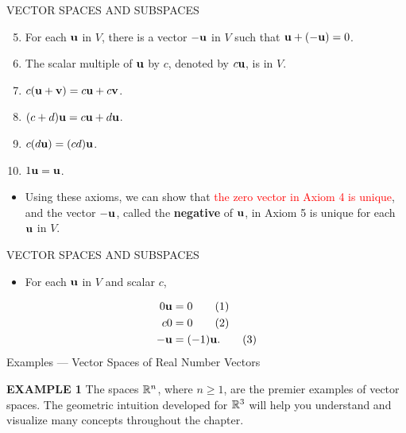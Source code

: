 \begin{frame}[shrink=9]{VECTOR SPACES AND SUBSPACES}
\begin{enumerate}
\setcounter{enumi}{4}
\item For each $\mathbf{u}$ in $V$, there is a vector $-\mathbf{u}$ in $V$ such that $\mathbf{u}+(-\mathbf{u})=0$.
\item The scalar multiple of $\mathbf{u}$ by $c$, denoted by $c\mathbf{u}$, is in $V$.
\item $c(\mathbf{u}+\mathbf{v})=c\mathbf{u}+c\mathbf{v}$.
\item $(c+d)\mathbf{u}=c\mathbf{u}+d\mathbf{u}$.
\item $c(d\mathbf{u})=(cd)\mathbf{u}$.
\item $1\mathbf{u}=\mathbf{u}$.
\end{enumerate}
\begin{itemize}
\item Using these axioms, we can show that \textcolor{red}{the zero vector in Axiom 4 is unique}, and the vector $-\mathbf{u}$, called the \textbf{negative} of $\mathbf{u}$, in Axiom 5 is unique for each $\mathbf{u}$ in $V$.
\end{itemize}
\end{frame}

\begin{frame}[shrink=8]{VECTOR SPACES AND SUBSPACES}
\begin{itemize}
\item For each $\mathbf{u}$ in $V$ and scalar $c$,
\end{itemize}
\begin{align}
0\mathbf{u}&=0 \tag{1}\\
c0&=0 \tag{2}\\
-\mathbf{u}&=(-1)\mathbf{u}. \tag{3}
\end{align}
\vspace{0.6cm}
{\Large\color{sourcecyan}Examples --- Vector Spaces of Real Number Vectors}
\medskip

\textcolor{red!70!black}{\textbf{EXAMPLE 1}}\quad
The spaces $\mathbb{R}^n$, where $n\geq1$, are the premier examples of vector spaces. The geometric intuition developed for $\mathbb{R}^3$ will help you understand and visualize many concepts throughout the chapter.
\end{frame}

